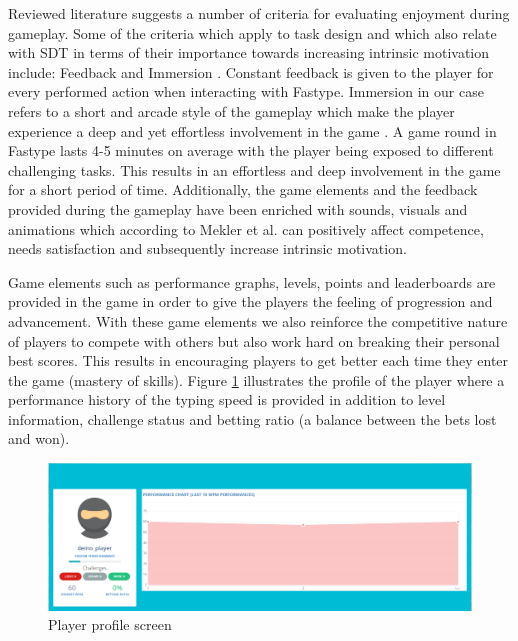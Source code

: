Reviewed literature suggests a number of criteria for evaluating enjoyment during gameplay. Some of the criteria which apply to task design and which also relate with SDT in terms of their importance towards increasing intrinsic motivation include: Feedback and Immersion \cite{41}. Constant feedback is given to the player for every performed action when interacting with Fastype. Immersion in our case refers to a short and arcade style of the gameplay which make the player experience a deep and yet effortless involvement in the game \cite{41}. A game round in Fastype lasts 4-5 minutes on average with the player being exposed to different challenging tasks. This results in an effortless and deep involvement in the game for a short period of time. Additionally, the game elements and the feedback provided during the gameplay have been enriched with sounds, visuals and animations which according to Mekler et al. \cite{46} can positively affect competence, needs satisfaction and subsequently increase intrinsic motivation.

Game elements such as performance graphs, levels, points and leaderboards are provided in the game in order to give the players the feeling of progression and advancement. With these game elements we also reinforce the competitive nature of players to compete with others but also work hard on breaking their personal best scores. This results in encouraging players to get better each time they enter the game (mastery of skills). Figure \ref{fig:game-profile} illustrates the profile of the player where a performance history of the typing speed is provided in addition to level information, challenge status and betting ratio (a balance between the bets lost and won).

\begin{figure}[]
    \centering
    \includegraphics[width=\linewidth]{figures/experiment2/profile.png}
    \caption{Player profile screen}
    \label{fig:game-profile}
\end{figure}

